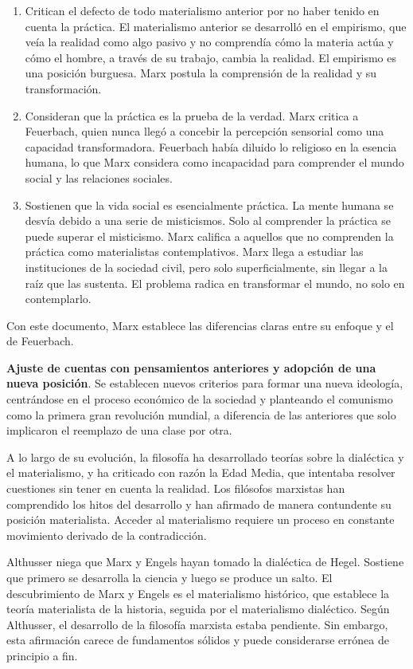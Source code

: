 \documentclass[
  letterpaper,
  DIV=11,
  numbers=noendperiod]{scrartcl}
\begin{document}
\begin{enumerate}
\def\labelenumi{\arabic{enumi}.}
\item
  Critican el defecto de todo materialismo anterior por no haber tenido
  en cuenta la práctica. El materialismo anterior se desarrolló en el
  empirismo, que veía la realidad como algo pasivo y no comprendía cómo
  la materia actúa y cómo el hombre, a través de su trabajo, cambia la
  realidad. El empirismo es una posición burguesa. Marx postula la
  comprensión de la realidad y su transformación.
\item
  Consideran que la práctica es la prueba de la verdad. Marx critica a
  Feuerbach, quien nunca llegó a concebir la percepción sensorial como
  una capacidad transformadora. Feuerbach había diluido lo religioso en
  la esencia humana, lo que Marx considera como incapacidad para
  comprender el mundo social y las relaciones sociales.
\item
  Sostienen que la vida social es esencialmente práctica. La mente
  humana se desvía debido a una serie de misticismos. Solo al comprender
  la práctica se puede superar el misticismo. Marx califica a aquellos
  que no comprenden la práctica como materialistas contemplativos. Marx
  llega a estudiar las instituciones de la sociedad civil, pero solo
  superficialmente, sin llegar a la raíz que las sustenta. El problema
  radica en transformar el mundo, no solo en contemplarlo.
\end{enumerate}

Con este documento, Marx establece las diferencias claras entre su
enfoque y el de Feuerbach.

\textbf{Ajuste de cuentas con pensamientos anteriores y adopción de una
nueva posición}. Se establecen nuevos criterios para formar una nueva
ideología, centrándose en el proceso económico de la sociedad y
planteando el comunismo como la primera gran revolución mundial, a
diferencia de las anteriores que solo implicaron el reemplazo de una
clase por otra.

A lo largo de su evolución, la filosofía ha desarrollado teorías sobre
la dialéctica y el materialismo, y ha criticado con razón la Edad Media,
que intentaba resolver cuestiones sin tener en cuenta la realidad. Los
filósofos marxistas han comprendido los hitos del desarrollo y han
afirmado de manera contundente su posición materialista. Acceder al
materialismo requiere un proceso en constante movimiento derivado de la
contradicción.

Althusser niega que Marx y Engels hayan tomado la dialéctica de Hegel.
Sostiene que primero se desarrolla la ciencia y luego se produce un
salto. El descubrimiento de Marx y Engels es el materialismo histórico,
que establece la teoría materialista de la historia, seguida por el
materialismo dialéctico. Según Althusser, el desarrollo de la filosofía
marxista estaba pendiente. Sin embargo, esta afirmación carece de
fundamentos sólidos y puede considerarse errónea de principio a fin.
\end{document}
